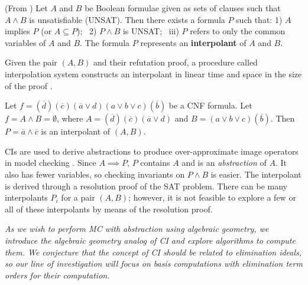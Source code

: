 \begin{Definition}
(From \cite{mcmillan:interpolation}) Let $A$ and $B$ be Boolean
  formulae given as sets of clauses such that $A \wedge B$ is
  unsatisfiable (UNSAT). Then there exists a formula $P$ such that: 
1) $A$ implies $P$ (or $A \subseteq P$); ~2) $P \wedge B$ is UNSAT; ~iii)
$P$ refers to only the common variables of $A$ and $B$. The formula
$P$ represents an {\bf interpolant} of $A$ and $B$. 

Given  the pair $(A, B)$ and their refutation proof, a procedure
called interpolation system constructs an interpolant in linear time
and space in the size of the proof \cite{mcmillan:interpolation}
\cite{pudlak:ci}. 
\end{Definition}

\begin{Example}\label{ex1}
Let $f = (\overline{d})(\overline{c})(\overline{a}\vee d)(a
\vee b \vee c)(\overline{b})$ be a CNF formula. Let $f = A \wedge B =
\emptyset$, where $A = (\overline{d})(\overline{c})(\overline{a}\vee
d)$ and  $B = (a \vee b \vee c)(\overline{b})$. Then $P = \overline{a}
\wedge \overline{c}$ is an interpolant of $(A, B)$. 
\end{Example}

CIs are used to derive abstractions to produce over-approximate image
operators in model checking \cite{mcmillan:interpolation}. Since $A
\implies P$, $P$ contains $A$ and is an {\it abstraction} of $A$. It
also has fewer variables, so checking  invariants on $P \wedge B$ is
easier. The interpolant is derived through a resolution proof of the
SAT problem. There can be many interpolants $P_i$ for a pair $(A,B)$; 
however, it is not feasible to explore a few or all of these
interpolants by means of the resolution proof. 

\begin{Problem}
{\it As we wish to perform MC with abstraction using algebraic
  geometry, we introduce the algebraic geometry analog of CI
  and explore algorithms to compute them. We conjecture that the
  concept of CI should be related to elimination ideals, so our line
  of investigation will focus on \Grobner basis computations with
  elimination term orders for their computation.
}
\end{Problem}


